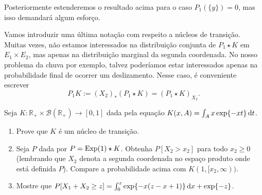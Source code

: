 Posteriormente estenderemos o resultado acima para o caso $P_1(\{y\}) = 0$, mas isso demandará algum esforço.

Vamos introduzir uma última notação com respeito a núcleos de transição.
Muitas vezes, não estamos interessados na distribuição conjunta de $P_1 \star K$ em $E_1 \times E_2$, mas apenas na distribuição marginal da segunda coordenada.
No nosso problema da chuva por exemplo, talvez poderíamos estar interessados apenas na probabilidade final de ocorrer um deslizamento.
Nesse caso, é conveniente escrever
\begin{equation}
  \label{e:P1_K}
  P_1 K := (X_2)_*(P_1 \star K) = (P_1 \star K)_{X_2}.
\end{equation}

\begin{exercise}
  Seja $K:\mathbb{R}_+ \times \mathcal{B}(\mathbb{R}_+) \to [0,1]$ dada pela equação $K(x,A) = \int_A x \exp\{-x t\} \mathop{}\!\mathrm{d} t$.
  \begin{enumerate}[\quad a)]
  \item Prove que $K$ \'e um n\'ucleo de transi\c{c}\~ao.
  \item Seja $P$ dada por $P = \textnormal{Exp}(1) \star K$.
    Obtenha $P[X_2 > x_2]$ para todo $x_2 \geq 0$ (lembrando que $X_2$ denota a segunda coordenada no espa\c{c}o produto onde est\'a definida $P$).
    Compare a probabilidade acima com $K(1,[x_2, \infty))$.
  \item Mostre que $P[X_1 + X_2 \geq z] = \int_0^z \exp \{-x(z-x+1)\} \mathop{}\!\mathrm{d} x + \exp\{-z\}$.
  \end{enumerate}
\end{exercise}



\vfill
\pagebreak


